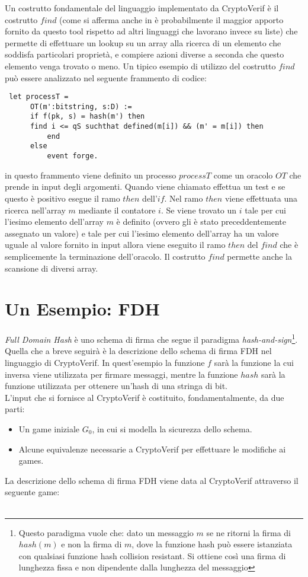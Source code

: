 \documentclass[a4paper,openright,twoside,12pt]{report}
\begin{document}
Un costrutto fondamentale del linguaggio implementato da CryptoVerif \`e il costrutto $find$ (come si afferma anche in \cite{BlanchetPointchevalCrypto06} \`e probabilmente il maggior apporto 
fornito da questo tool rispetto ad altri linguaggi che lavorano invece su liste) 
che permette di effettuare un lookup su un array alla ricerca di un elemento che soddisfa particolari propriet\`a, e compiere azioni diverse a seconda che 
questo elemento venga trovato o meno. Un tipico esempio di utilizzo del costrutto $find$ pu\`o essere analizzato nel seguente frammento di codice:
\begin{verbatim}
 let processT =
      OT(m':bitstring, s:D) :=
      if f(pk, s) = hash(m') then
      find i <= qS suchthat defined(m[i]) && (m' = m[i]) then 
          end 
      else
          event forge.
\end{verbatim}
in questo frammento viene definito un processo $processT$ come un oracolo $OT$ che prende in input degli argomenti. Quando viene chiamato effettua un test e se questo \`e positivo esegue il ramo
$then$ dell'$if$. Nel ramo $then$ viene effettuata una ricerca nell'array $m$ mediante il contatore $i$. Se viene trovato un $i$ tale per cui l'iesimo elemento dell'array $m$ \`e definito (ovvero gli \`e stato
preceddentemente assegnato un valore) e tale per cui l'iesimo elemento dell'array ha un valore uguale al valore fornito in input allora viene eseguito il ramo $then$ del $find$ che \`e semplicemente
la terminazione dell'oracolo.
Il costrutto $find$ permette anche la scansione di diversi array. 
\section{Un Esempio: FDH}
\emph{Full Domain Hash} \`e uno schema di firma che segue il paradigma \emph{hash-and-sign}\footnote{Questo paradigma vuole che: dato un messaggio $m$ se ne ritorni 
la firma di $hash(m)$ e non la firma di $m$, dove la funzione hash pu\`o essere istanziata con qualsiasi funzione hash collision resistant. 
Si ottiene cos\`i una firma di lunghezza fissa e non dipendente dalla lunghezza del messaggio}. 
Quella che a breve seguir\`a \`e la descrizione dello schema di firma FDH nel linguaggio di CryptoVerif. In quest'esempio la funzione $f$ sar\`a la funzione la cui inversa
viene utilizzata per firmare messaggi, mentre la funzione $hash$ sar\`a la funzione utilizzata per ottenere un'hash di una stringa di bit.\\
L'input che si fornisce al CryptoVerif \`e costituito, fondamentalmente, da due parti: 
\begin{itemize}
 \item Un game iniziale $G_0$, in cui si modella la sicurezza dello schema.
 \item Alcune equivalenze necessarie a CryptoVerif per effettuare le modifiche ai games. 
\end{itemize}
La descrizione dello schema di firma FDH viene data al CryptoVerif attraverso il seguente game:\\ \\
\end{document}
